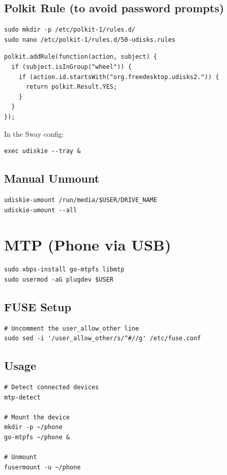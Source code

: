 \documentclass[12pt, a4paper]{book}
\begin{document}
\subsection{Polkit Rule (to avoid password prompts)}
\begin{lstlisting}
sudo mkdir -p /etc/polkit-1/rules.d/
sudo nano /etc/polkit-1/rules.d/50-udisks.rules
\end{lstlisting}

\begin{lstlisting}
polkit.addRule(function(action, subject) {
  if (subject.isInGroup("wheel")) {
    if (action.id.startsWith("org.freedesktop.udisks2.")) {
      return polkit.Result.YES;
    }
  }
});
\end{lstlisting}

In the Sway config:
\begin{lstlisting}
exec udiskie --tray &
\end{lstlisting}

\subsection{Manual Unmount}
\begin{lstlisting}
udiskie-umount /run/media/$USER/DRIVE_NAME
udiskie-umount --all
\end{lstlisting}

\section{MTP (Phone via USB)}
\begin{lstlisting}
sudo xbps-install go-mtpfs libmtp
sudo usermod -aG plugdev $USER
\end{lstlisting}

\subsection{FUSE Setup}
\begin{lstlisting}
# Uncomment the user_allow_other line
sudo sed -i '/user_allow_other/s/^#//g' /etc/fuse.conf
\end{lstlisting}

\subsection{Usage}
\begin{lstlisting}
# Detect connected devices
mtp-detect

# Mount the device
mkdir -p ~/phone
go-mtpfs ~/phone &

# Unmount
fusermount -u ~/phone
\end{lstlisting}
\end{document}
